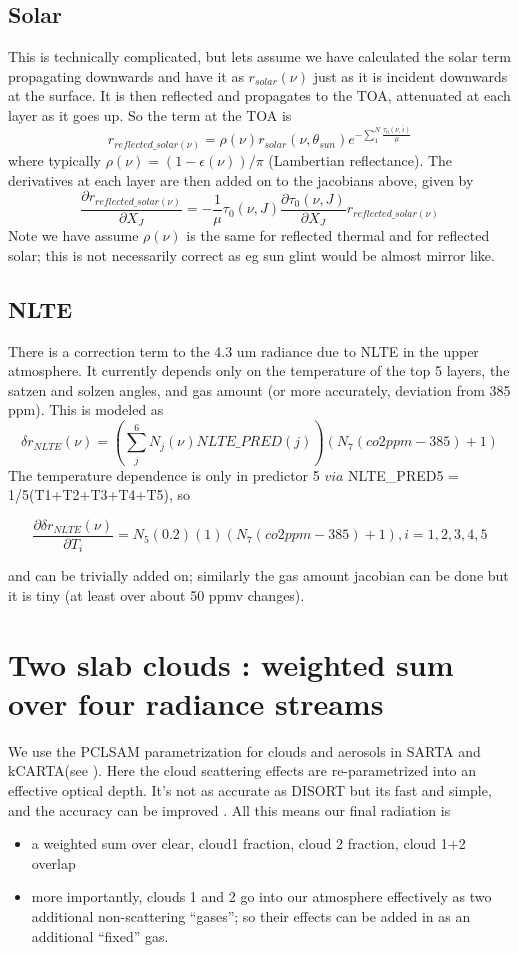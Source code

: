 \documentclass[11pt]{article}
\newcommand{\kc}{\textsf{kCARTA}\xspace}
\newcommand{\sa}{\textsf{SARTA}\xspace}
\begin{document}
\subsection{Solar}
This is technically complicated, but lets assume we have calculated
the solar term propagating downwards and have it as $r_{solar}(\nu)$
just as it is incident downwards at the surface. It is then reflected
and propagates to the TOA, attenuated at each layer as it goes up. So
the term at the TOA is 
\[
r_{reflected\_solar(\nu)} = \rho(\nu) r_{solar}(\nu,\theta_{sun}) e^{-\sum_1^N \frac{\tau_0(\nu,i)}{\mu}}
\]
where typically $\rho(\nu) = (1-\epsilon(\nu))/\pi$ (Lambertian
reflectance). The derivatives at each layer are then added on to the jacobians above, given by
\[
\frac{\partial r_{reflected\_solar(\nu)}}{\partial X_J} = -\frac{1}{\mu} \tau_0(\nu,J) \frac{\partial \tau_0(\nu,J)}{\partial X_J}r_{reflected\_solar(\nu)}
\]
Note we have assume $\rho(\nu)$ is the same for reflected thermal and
for reflected solar; this is not necessarily correct as eg sun glint
would be almost mirror like.

\subsection{NLTE}
There is a correction term to the 4.3 um radiance due to NLTE
in the upper atmosphere. It currently depends only on the temperature
of the top 5 layers, the satzen and solzen angles, and \cd gas amount
(or more accurately, deviation from 385 ppm). This is modeled as
\[
\delta r_{NLTE}(\nu) = (\sum_j^6 N_j(\nu) NLTE\_PRED(j)) (N_7 (co2ppm-385)+1)
\]
The temperature dependence is only in predictor 5 $via$ NLTE\_PRED5 = 1/5(T1+T2+T3+T4+T5), so 

\[
\frac{\partial \delta r_{NLTE}(\nu)}{\partial T_i} = N_5 (0.2) (1) (N_7 (co2ppm-385)+1), i=1,2,3,4,5
\]

and can be trivially added on; similarly the \cd gas amount jacobian can be done but it is tiny (at least over about 50 ppmv changes).

\section{Two slab clouds : weighted sum over four radiance streams}

We use the PCLSAM parametrization for clouds and aerosols in \sa and
\kc (see \citep{mac:17*2,mac:19}). Here the cloud scattering effects
are re-parametrized into an effective optical depth. It's not as
accurate as \eg DISORT \citep{stam:88} but its fast and simple, and the
accuracy can be improved \citep{tang:18}. All this means our final
radiation is
\begin{itemize}
\item a weighted sum over clear, cloud1 fraction, cloud 2 fraction, cloud 1+2 overlap
\item more importantly, clouds 1 and 2 go into our atmosphere
  effectively as two additional non-scattering ``gases''; so their
  effects can be added in as an additional ``fixed'' gas.
\end{itemize}
\end{document}
